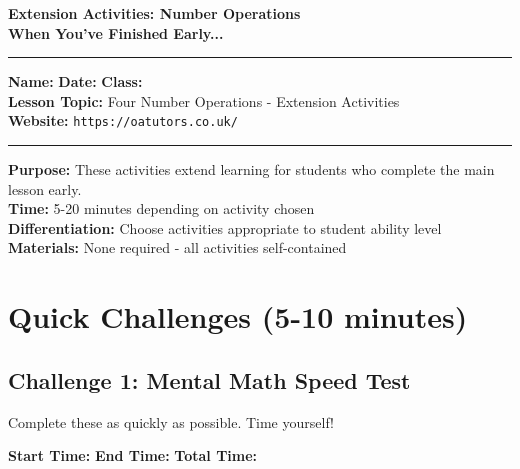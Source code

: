 \documentclass{article}
\begin{document}
\onehalfspacing

\begin{center}
\textbf{\Large Extension Activities: Number Operations}\\
\textbf{\large When You've Finished Early...}
\vspace{0.2cm}
\end{center}

\hrule
\vspace{0.1cm}

\textbf{Name:} \underline{\hspace{4cm}} \quad \textbf{Date:} \underline{\hspace{3cm}} \quad \textbf{Class:} \underline{\hspace{2cm}} \\
\textbf{Lesson Topic:} Four Number Operations - Extension Activities \\
\textbf{Website:} \texttt{https://oatutors.co.uk/}

\vspace{0.2cm}
\hrule
\vspace{0.3cm}

\begin{tcolorbox}[colback=blue!5,colframe=blue!60,title=Teacher Instructions]
\textbf{Purpose:} These activities extend learning for students who complete the main lesson early.\\
\textbf{Time:} 5-20 minutes depending on activity chosen\\
\textbf{Differentiation:} Choose activities appropriate to student ability level\\
\textbf{Materials:} None required - all activities self-contained
\end{tcolorbox}

\section{Quick Challenges (5-10 minutes)}

\subsection*{Challenge 1: Mental Math Speed Test}
Complete these as quickly as possible. Time yourself!

\textbf{Start Time:} \underline{\hspace{2cm}} \textbf{End Time:} \underline{\hspace{2cm}} \textbf{Total Time:} \underline{\hspace{2cm}}
\end{document}
